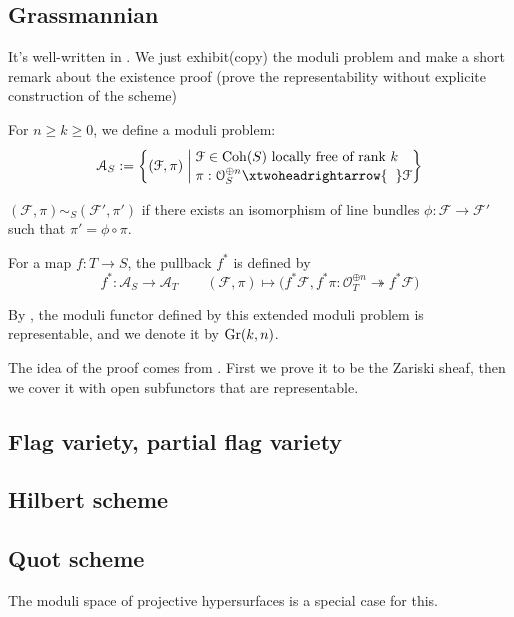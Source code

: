 \subsection{Grassmannian}
It's well-written in \cite[16.7]{FOAG}. We just exhibit(copy) the moduli problem and make a short remark about the existence proof (prove the representability without explicite construction of the scheme)
\begin{eg}[{Grassmannian $\Gr(k,n)$}]
For $n \geqslant k \geqslant 0$, we define a moduli problem:
$$\mathcal{A}_S:=\left\{(\mathcal{F},\pi)  \;\middle|\; \begin{aligned}
&\\[-5mm]
&\mathcal{F} \in \Coh(S) \text{ locally free of rank $k$ }\\[-1mm]
& \pi:\mathcal{O}_S^{\oplus n} \xtwoheadrightarrow{\hspace{2mm}}  \mathcal{F}
\end{aligned}
 \right\}$$
 
   $(\mathcal{F},\pi) \sim_S (\mathcal{F}',\pi')$ if there exists an isomorphism of line bundles $\phi:\mathcal{F} \longrightarrow \mathcal{F}'$ such that $\pi'=\phi \circ \pi$.
   
   For a map $f:T \longrightarrow S$, the pullback $f^*$ is defined by
      $$f^*:\mathcal{A}_S \longrightarrow \mathcal{A}_T \qquad (\mathcal{F},\pi) \longmapsto \big(f^*\mathcal{F},f^* \pi:\mathcal{O}_T^{\oplus n} \twoheadrightarrow f^*\mathcal{F}\big)$$
      
      By \cite[16.7, page 442-443]{FOAG}, the moduli functor defined by this extended moduli problem is representable, and we denote it by $\Gr(k,n)$.
\end{eg}
\begin{remark}
The idea of the proof comes from \cite[9.1.I]{FOAG}. First we prove it to be the Zariski sheaf, then we cover it with open subfunctors that are representable.
\end{remark}
\subsection{Flag variety, partial flag variety}
\subsection{Hilbert scheme}
\subsection{Quot scheme}
The moduli space of projective hypersurfaces is a special case for this.
